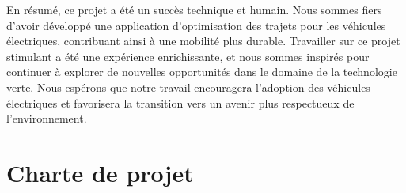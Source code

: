\documentclass[a4paper, 12pt]{report}
\begin{document}
En résumé, ce projet a été un succès technique et humain. Nous sommes fiers d'avoir développé une application d'optimisation des trajets pour les véhicules électriques, contribuant ainsi à une mobilité plus durable. Travailler sur ce projet stimulant a été une expérience enrichissante, et nous sommes inspirés pour continuer à explorer de nouvelles opportunités dans le domaine de la technologie verte. Nous espérons que notre travail encouragera l'adoption des véhicules électriques et favorisera la transition vers un avenir plus respectueux de l'environnement.

\appendix
\chapter{Charte de projet}
    \label{chap:AnnexeA}
    
\end{document}
